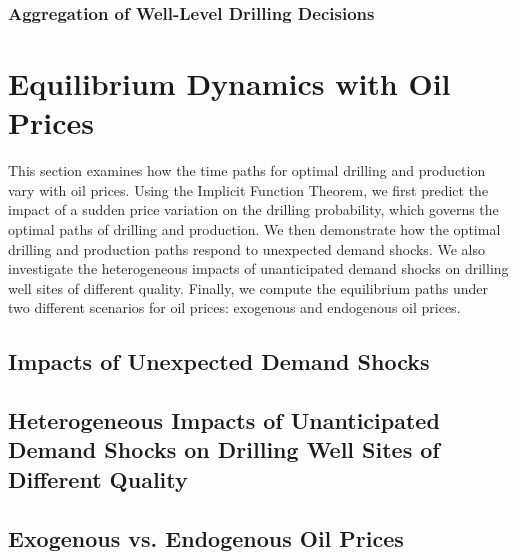 \subsubsection{Aggregation of Well-Level Drilling Decisions}
\label{C3-SubSubSection:Aggregation-of-Well-Level-Drilling-Decisions}




\section{Equilibrium Dynamics with Oil Prices}
\label{C3-Section:Equilibrium-Dynamics-with-Oil-Prices}
This section examines how the time paths for optimal drilling and production vary with oil prices. Using the Implicit Function Theorem, we first predict the impact of a sudden price variation on the drilling probability, which governs the optimal paths of drilling and production. We then demonstrate how the optimal drilling and production paths respond to unexpected demand shocks. We also investigate the heterogeneous impacts of unanticipated demand shocks on drilling well sites of different quality. Finally, we compute the equilibrium paths under two different scenarios for oil prices: exogenous and endogenous oil prices.


\subsection{Impacts of Unexpected Demand Shocks}
\label{C3-SubSection:Impacts-of-Unexpected-Demand-Shocks}


\subsection{Heterogeneous Impacts of Unanticipated Demand Shocks on Drilling Well Sites of Different Quality}
\label{C3-SubSection:Heterogeneous-Impacts-of-Unanticipated-Demand-Shocks-on-Drilling-Well-Sites-of-Different-Quality}


\subsection{Exogenous vs. Endogenous Oil Prices}
\label{C3-SubSection:Exogenous-vs-Endogenous-Oil-Prices}




